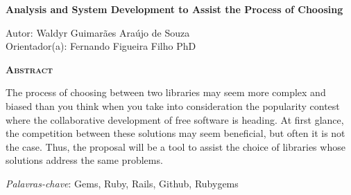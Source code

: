 \begin{center}
	{\Large{\textbf{Analysis and System Development to Assist the Process of Choosing}}}
\end{center}

\vspace{1cm}

\begin{flushright}
	Autor: Waldyr Guimarães Araújo de Souza\\
	Orientador(a): Fernando Figueira Filho PhD
\end{flushright}

\vspace{1cm}

\begin{center}
	\Large{\textsc{\textbf{Abstract}}}
\end{center}

\noindent The process of choosing between two libraries may seem more complex and biased than you think when you take into consideration the popularity contest where the collaborative development of free software is heading. At first glance, the competition between these solutions may seem beneficial, but often it is not the case. Thus, the proposal will be a tool to assist the choice of libraries whose solutions address the same problems.

\noindent\textit{Palavras-chave}: Gems, Ruby, Rails, Github, Rubygems